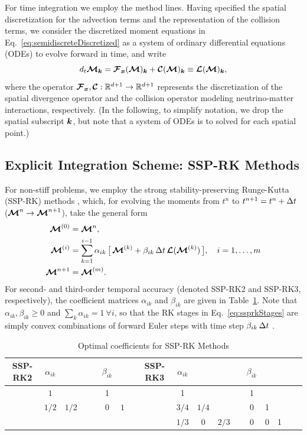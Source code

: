 \documentclass[10pt,preprint]{aastex}
\begin{document}
For time integration we employ the method lines.  
Having specified the spatial discretization for the advection terms and the representation of the collision terms, we consider the discretized moment equations in Eq.~\eqref{eq:semidiscreteDiscretized} as a system of ordinary differential equations (ODEs) to evolve forward in time, and write
\begin{equation}
  d_{t}\boldsymbol{\mathcal{M}}_{\boldsymbol{k}}
  =\boldsymbol{\mathcal{F}}_{\boldsymbol{x}}(\boldsymbol{\mathcal{M}})_{\boldsymbol{k}}+\boldsymbol{\mathcal{C}}(\boldsymbol{\mathcal{M}})_{\boldsymbol{k}}
  \equiv\boldsymbol{\mathcal{L}}(\boldsymbol{\mathcal{M}})_{\boldsymbol{k}},
  \label{eq:momentEquationsODEs}
\end{equation}
where the operator $\boldsymbol{\mathcal{F}}_{\boldsymbol{x}},\boldsymbol{\mathcal{C}}:\mathbb{R}^{d+1}\to\mathbb{R}^{d+1}$ represents the discretization of the spatial divergence operator and the collision operator modeling neutrino-matter interactions, respectively.  
(In the following, to simplify notation, we drop the spatial subscript $\boldsymbol{k}$, but note that a system of ODEs is to solved for each spatial point.)

\subsection{Explicit Integration Scheme: SSP-RK Methods}
\label{sec:explicitTime}

For non-stiff problems, we employ the strong stability-preserving Runge-Kutta (SSP-RK) methods \citep[e.g.,][]{gottlieb_etal_2001}, which, for evolving the moments from $t^{n}$ to $t^{n+1}=t^{n}+\Delta t$ ($\boldsymbol{\mathcal{M}}^{n}\to\boldsymbol{\mathcal{M}}^{n+1}$), take the general form
\begin{align}
  \boldsymbol{\mathcal{M}}^{(0)}
  &=\boldsymbol{\mathcal{M}}^{n}, \\
  \boldsymbol{\mathcal{M}}^{(i)}
  &=\sum_{k=1}^{i-1}\alpha_{ik}\,\big[\,\boldsymbol{\mathcal{M}}^{(k)}+\beta_{ik}\,\Delta t\,\boldsymbol{\mathcal{L}}(\boldsymbol{\mathcal{M}}^{(k)})\,\big], \quad i=1,\ldots,m 
  \label{eq:ssprkStages} \\
  \boldsymbol{\mathcal{M}}^{n+1}
  &=\boldsymbol{\mathcal{M}}^{(m)}.  
\end{align}
For second- and third-order temporal accuracy (denoted SSP-RK2 and SSP-RK3, respectively), the coefficient matrices $\alpha_{ik}$ and $\beta_{ik}$ are given in Table~\ref{tab:ssprkCoefficients}.  
Note that $\alpha_{ik},\beta_{ik}\ge0$ and $\sum_{k}\alpha_{ik}=1~\forall i$, so that the RK stages in Eq.~\eqref{eq:ssprkStages} are simply convex combinations of forward Euler steps with time step $\beta_{ik}\,\Delta t$ \citep{shuOsher_1988}.  

\begin{table}
  \begin{center}
  \caption{Optimal coefficients for SSP-RK Methods \citep{shuOsher_1988} \label{tab:ssprkCoefficients}}
  \begin{tabular}{cccccccccccccccccc}
    \midrule
     SSP-RK2 & $\alpha_{ik}$ & & & & $\beta_{ik}$ & & & SSP-RK3 & $\alpha_{ik}$ & & & & $\beta_{ik}$ \\
    \midrule
    \midrule
      & $1$ & & & & 1 & & & & 1 & & & & 1 \\  
      & $1/2$ & $1/2$ & & & $0$ & $1$ & & & $3/4$ & $1/4$ & & & 0 & 1  \\
      & & & & & & & & & $1/3$ & 0 & $2/3$ & & 0 & 0 & 1 \\ 
    \midrule
    \midrule
  \end{tabular}
  \end{center}
\end{table}
\end{document}
